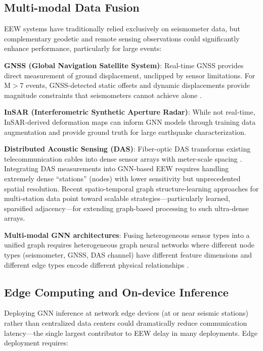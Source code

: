 \documentclass[review,authoryear]{elsarticle}
\begin{document}
\subsection{Multi-modal Data Fusion}

EEW systems have traditionally relied exclusively on seismometer data, but complementary geodetic and remote sensing observations could significantly enhance performance, particularly for large events:

\textbf{GNSS (Global Navigation Satellite System)}: Real-time GNSS provides direct measurement of ground displacement, unclipped by sensor limitations. For M$>$7 events, GNSS-detected static offsets and dynamic displacements provide magnitude constraints that seismometers cannot achieve alone \citep{gualandi2017geodetic}.

\textbf{InSAR (Interferometric Synthetic Aperture Radar)}: While not real-time, InSAR-derived deformation maps can inform GNN models through training data augmentation and provide ground truth for large earthquake characterization.

\textbf{Distributed Acoustic Sensing (DAS)}: Fiber-optic DAS transforms existing telecommunication cables into dense sensor arrays with meter-scale spacing \citep{zhu2023seismic}. Integrating DAS measurements into GNN-based EEW requires handling extremely dense ``stations'' (nodes) with lower sensitivity but unprecedented spatial resolution. Recent spatio-temporal graph structure-learning approaches for multi-station data \citep{piriyasatit2025stgsl} point toward scalable strategies---particularly learned, sparsified adjacency---for extending graph-based processing to such ultra-dense arrays.

\textbf{Multi-modal GNN architectures}: Fusing heterogeneous sensor types into a unified graph requires heterogeneous graph neural networks where different node types (seismometer, GNSS, DAS channel) have different feature dimensions and different edge types encode different physical relationships \citep{baltrusaitis2019multimodal}.

\subsection{Edge Computing and On-device Inference}

Deploying GNN inference at network edge devices (at or near seismic stations) rather than centralized data centers could dramatically reduce communication latency---the single largest contributor to EEW delay in many deployments. Edge deployment requires:
\end{document}
